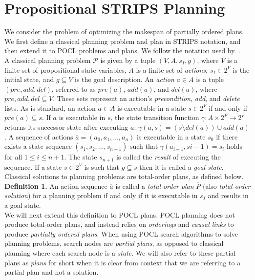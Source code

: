 \section{Propositional STRIPS Planning}

We consider the problem of optimizing the makespan of partially ordered plans. We first define a classical planning problem and plan in STRIPS notation, and then extend it to POCL problems and plans. We follow the notation used by~\cite{Bercher2020POPvsPOCL}.\\


A classical planning problem $\mathcal{P}$ is given by a tuple $(V,A,s_I,g)$, where $V$ is a finite set of propositional state variables, $A$ is a finite set of \textit{actions}, $s_I\in 2^V$ is the initial state, and $g\subseteq V$ is the goal description. An \textit{action} $a\in A$ is a tuple $(pre, add, del)$, referred to as $pre(a)$, $add(a)$, and $del(a)$, where $pre, add, del \subseteq V$. These sets represent an action's \textit{precondition}, \textit{add}, and \textit{delete} lists. As is standard, an action $a\in A$ is executable in a state $s\in 2^V$ if and only if $pre(a)\subseteq s$. If $a$ is executable in $s$, the state transition function $\gamma : A \times 2^F \rightarrow 2^F$ returns its successor state after executing $a$: $\gamma (a,s)=(s\setminus del(a))\cup add(a)$. A sequence of actions $\overline{a}=(a_0,a_1,\ldots,a_n)$ is executable in a state $s_0$ if there exists a state sequence $(s_1,s_2,\ldots ,s_{n+1})$ such that $\gamma (a_{i-1},s{i-1})=s_i$ holds for all $1\leq i \leq n+1$. The state $s_{n+1}$ is called the \textit{result} of executing the sequence. If a state $s\in 2^V$ is such that $g\subseteq s$ then it is called a \textit{goal state}.\\


Classical solutions to planning problems are total-order plans, as defined below.\\

\textbf{Definition 1.} An action sequence $\overline{a}$ is called a \textit{total-order plan} $\overline{P}$ (also \textit{total-order solution}) for a planning problem if and only if it is executable in $s_I$ and results in a goal state.\\


We will next extend this definition to POCL plans. POCL planning does not produce total-order plans, and instead relies on \textit{orderings} and \textit{causal links} to produce \textit{partially ordered plans}. When using POCL search algorithms to solve planning problems, search nodes are \textit{partial plans}, as opposed to classical planning where each search node is a \textit{state}. We will also refer to these partial plans as \textit{plans} for short when it is clear from context that we are referring to a partial plan and not a solution.\\


